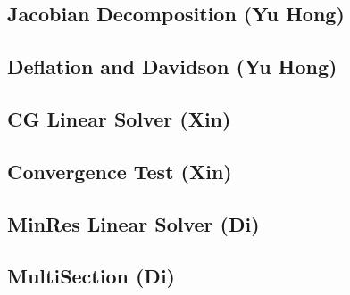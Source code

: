 \subsection{Jacobian Decomposition (Yu Hong)}

\subsection{Deflation and Davidson (Yu Hong)}

\subsection{CG Linear Solver (Xin)}

\subsection{Convergence Test (Xin)}

\subsection{MinRes Linear Solver (Di)}


\subsection{MultiSection (Di)}
